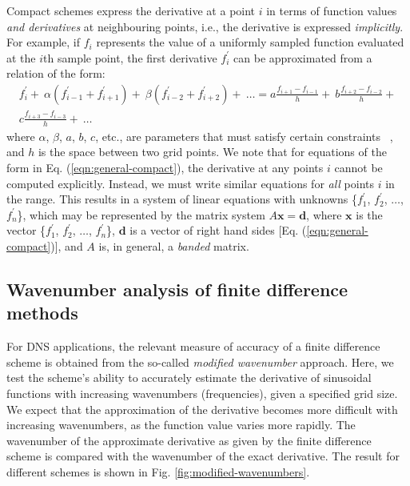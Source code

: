Compact schemes express the derivative at a point $i$
in terms of
function values \emph{and derivatives}
at neighbouring points,
i.e., the derivative is expressed \emph{implicitly}.
For example,
if $f_i$ represents the value of
a uniformly sampled function evaluated at the $i$th sample point,
the first derivative $f^{\prime}_i$ can be approximated from
a relation of the form:
%
\begin{equation}
\begin{split}
    f_i^{\prime} + \
    \alpha(f^{\prime}_{i-1} + f^{\prime}_{i+1}) + \
    \beta(f^{\prime}_{i-2} + f^{\prime}_{i+2}) + \
    \hdots
    = 
    a\frac{f_{i+1} - f_{i-1}}{h} + \
    b\frac{f_{i+2} - f_{i-2}}{h} + \\
    c\frac{f_{i+3} - f_{i-3}}{h} + \
    \hdots
\end{split}
\label{eqn:general-compact}
\end{equation}
%
where $\alpha$, $\beta$, $a$, $b$, $c$, etc.,
are parameters that must satisfy certain constraints ~\cite{kennedy1994several,lele1992compact},
and $h$ is the space between two grid points.
We note that for equations of the form in Eq. (\ref{eqn:general-compact}),
the derivative at any points $i$ cannot be computed explicitly.
Instead, we must write similar equations for \emph{all} points $i$
in the range.
This results in a system of linear equations
with unknowns \{$f^{\prime}_1$, $f^{\prime}_2$, $\hdots$, $f^{\prime}_n$\},
which may be represented by the matrix system $A\bm{x}=\bm{d}$,
where $\bm{x}$ is the vector
\{$f^{\prime}_1$, $f^{\prime}_2$, $\hdots$, $f^{\prime}_n$\},
$\bm{d}$ is a vector of right hand sides [Eq. (\ref{eqn:general-compact})],
and $A$ is, in general, a \emph{banded} matrix.

\subsection{Wavenumber analysis of finite difference methods}
\label{subsec:wavenumber-analysis}

For DNS applications, the relevant measure of accuracy of a
finite difference scheme is obtained from the so-called
\emph{modified wavenumber} approach.
Here, we test the scheme's ability to
accurately estimate the derivative of sinusoidal functions
with increasing wavenumbers (frequencies),
given a specified grid size. 
We expect that the approximation of the derivative
becomes more difficult with increasing wavenumbers,
as the function value varies more rapidly.
The wavenumber of the approximate derivative
as given by the finite difference scheme is compared with
the wavenumber of the exact derivative.
The result for different schemes is shown
in Fig. \ref{fig:modified-wavenumbers}.

